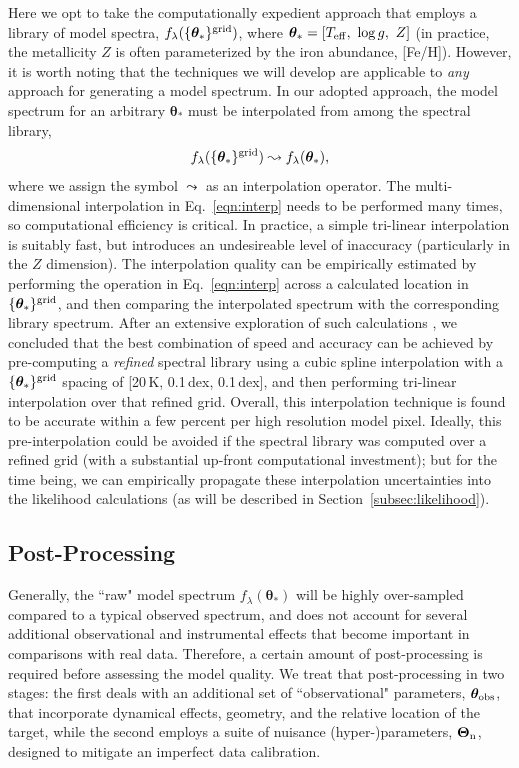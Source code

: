\documentclass[iop,floatfix]{emulateapj}
\newcommand{\vt}{ {\bm \theta}}
\newcommand{\vT}{ {\bm \Theta}}
\begin{document}
Here we opt to take the computationally expedient approach that employs a library of model spectra, 
$f_{\lambda}(\{\vt_{\ast}\}^{\rm grid})$, where $\vt_{\ast} = [T_{\rm eff}, \,\, \log{g}, \,\, Z]$ 
(in practice, the metallicity $Z$ is often parameterized by the iron abundance, [Fe/H]).  However, 
it is worth noting that the techniques we will develop are applicable to {\it any} approach for 
generating a model spectrum.  In our adopted approach, the model spectrum for an arbitrary 
$\vt_{\ast}$ must be interpolated from among the spectral library, 
\begin{equation}
f_{\lambda}(\{\vt_{\ast}\}^{\rm grid}) \leadsto f_{\lambda}(\vt_{\ast}),
\label{eqn:interp}
\end{equation}
where we assign the symbol $\leadsto$ as an interpolation operator.  The multi-dimensional 
interpolation in Eq.~\ref{eqn:interp} needs to be performed many times, so computational efficiency 
is critical.  In practice, a simple tri-linear interpolation is suitably fast, but introduces an 
undesireable level of inaccuracy (particularly in the $Z$ dimension).  The interpolation quality 
can be empirically estimated by performing the operation in Eq.~\ref{eqn:interp} across a 
calculated location in $\{\vt_{\ast}\}^{\rm grid}$, and then comparing the interpolated spectrum 
with the corresponding library spectrum.  After an extensive exploration of such calculations 
\citep[see also][]{husser12}, we concluded that the best combination of speed and accuracy can be 
achieved by pre-computing a {\it refined} spectral library using a cubic spline interpolation with 
a $\{\vt_{\ast}\}^{\rm grid}$ spacing of [20\,K, 0.1\,dex, 0.1\,dex], and then performing 
tri-linear interpolation over that refined grid.  Overall, this interpolation technique is found to 
be accurate within a few percent per high resolution model pixel.  Ideally, this pre-interpolation 
could be avoided if the spectral library was computed over a refined grid (with a substantial 
up-front computational investment); but for the time being, we can empirically propagate these 
interpolation uncertainties into the likelihood calculations (as will be described in 
Section~\ref{subsec:likelihood}).  


\subsection{Post-Processing}
\label{subsec:postprocess}

Generally, the ``raw" model spectrum $f_{\lambda}(\vt_{\ast})$ will be highly over-sampled compared 
to a typical observed spectrum, and does not account for several additional observational and 
instrumental effects that become important in comparisons with real data.  Therefore, a certain 
amount of post-processing is required before assessing the model quality.  We treat that 
post-processing in two stages: the first deals with an additional set of ``observational" 
parameters, $\vt_{\rm obs}$, that incorporate dynamical effects, geometry, and the relative 
location of the target, while the second employs a suite of nuisance (hyper-)parameters, $\vT_{\rm 
n}$, designed to mitigate an imperfect data calibration.
\end{document}
